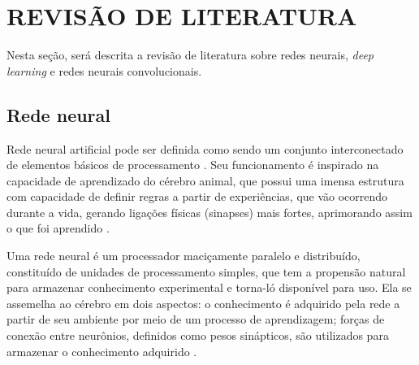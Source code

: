 
\chapter{REVISÃO DE LITERATURA}
\label{chap:fundamentacaoTeorica}

Nesta seção, será descrita a revisão de literatura sobre redes neurais, \textit{deep learning} e redes neurais convolucionais.

\section{Rede neural}
Rede neural artificial pode ser definida como sendo um conjunto interconectado de elementos básicos de processamento \cite{Gurney1997}. Seu funcionamento é inspirado na capacidade de aprendizado do cérebro animal, que possui uma imensa estrutura com capacidade de definir regras a partir de experiências, que vão ocorrendo durante a vida, gerando ligações físicas (sinapses) mais fortes, aprimorando assim o que foi aprendido \cite{haykin2001}.
\begin{citacao}
  Uma rede neural é um processador maciçamente paralelo e distribuído, constituído de unidades de processamento simples, que tem a propensão natural para armazenar conhecimento experimental e torna-ló disponível para uso. Ela se assemelha ao cérebro em dois aspectos: o conhecimento é adquirido pela rede a partir de seu ambiente por meio de um processo de aprendizagem; forças de conexão entre neurônios, definidos como pesos sinápticos, são utilizados para armazenar o conhecimento adquirido \cite{haykin2001}.
\end{citacao}

